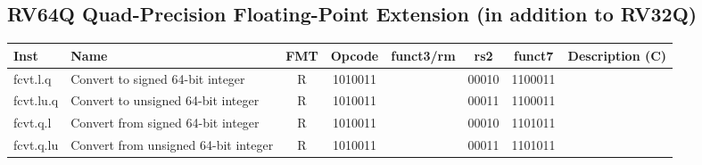 \subsection*{RV64Q Quad-Precision Floating-Point Extension (in addition to RV32Q)}
\begin{center}

\begin{tabular}
{T | l | c | c | c | c | c | T} \hline
\rm Inst & Name                    & FMT & \rm Opcode & \rm funct3/rm & \rm rs2 & \rm funct7 & \rm Description (C)          \\ \hline
fcvt.l.q    & Convert to signed 64-bit integer     & R   & 1010011  &      & 00010    & 1100011   &                \\
fcvt.lu.q   & Convert to unsigned 64-bit integer   & R   & 1010011  &      & 00011    & 1100011   &                \\
fcvt.q.l    & Convert from signed 64-bit integer   & R   & 1010011  &      & 00010    & 1101011   &               \\
fcvt.q.lu   & Convert from unsigned 64-bit integer & R   & 1010011  &      & 00011    & 1101011   &               \\

\end{tabular}
\end{center}
